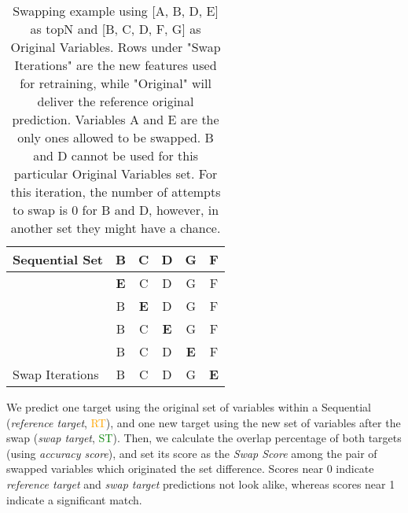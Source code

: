 \begin{table}[!htbp]
{\begin{tabular}{l|c|c|c|c|c|}
\multicolumn{1}{|l|}{Sequential Set}                          & B                                  & C                                  & D                                  & G                                  & F                                  \\ \hline
\multicolumn{1}{|l|}{}                                  & \cellcolor{blue}\textbf{E} & \cellcolor[HTML]{F1F8F6}C          & \cellcolor[HTML]{F1F8F6}D          & \cellcolor[HTML]{F1F8F6}G          & \cellcolor[HTML]{F1F8F6}F          \\ \cline{2-6} 
\multicolumn{1}{|l|}{}                                  & B                                  & \cellcolor{blue}\textbf{E} & D                                  & G                                  & F                                  \\ \cline{2-6} 
\multicolumn{1}{|l|}{}                                  & \cellcolor[HTML]{F1F8F6}B          & \cellcolor[HTML]{F1F8F6}C          & \cellcolor{blue}\textbf{E} & \cellcolor[HTML]{F1F8F6}G          & \cellcolor[HTML]{F1F8F6}F          \\ \cline{2-6} 
\multicolumn{1}{|l|}{}                                  & B                                  & C                                  & D                                  & \cellcolor{blue}\textbf{E} & F                                  \\ \cline{2-6} 
\multicolumn{1}{|l|}{\multirow{-5}{*}{Swap Iterations}} & \cellcolor[HTML]{F1F8F6}B          & \cellcolor[HTML]{F1F8F6}C          & \cellcolor[HTML]{F1F8F6}D          & \cellcolor[HTML]{F1F8F6}G          & \cellcolor{blue}\textbf{E} \\ \hline
\end{tabular}%
}
\label{tbl:swap-example}
\caption{Swapping example using [A, B, D, E] as topN and [B, C, D, F, G] as Original Variables. Rows under "Swap Iterations" are the new features used for retraining, while "Original" will deliver the reference original prediction. Variables A and E are the only ones allowed to be swapped. B and D cannot be used for this particular Original Variables set. For this iteration, the number of attempts to swap is 0 for B and D, however, in another set they might have a chance.}
\end{table}

We predict one target using the original set of variables within a Sequential (\emph{reference target}, \textcolor{orange}{RT}), and one new target using the new set of variables after the swap (\emph{swap target}, \textcolor{green}{ST}). Then, we calculate the overlap percentage of both targets (using \emph{accuracy score}), and set its score as the \emph{Swap Score} among the pair of swapped variables which originated the set difference. Scores near 0 indicate \emph{reference target} and \emph{swap target} predictions not look alike, whereas scores near 1 indicate a significant match.

